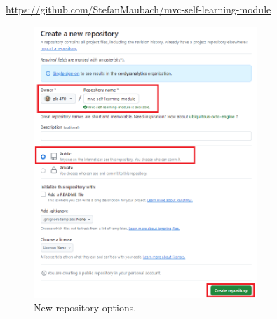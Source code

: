 \documentclass[a4paper,10pt]{article}
\begin{document}
\url{https://github.com/StefanMaubach/mvc-self-learning-module}

\begin{figure}[htbp]
    \centering
    \includegraphics[width=0.75\textwidth]{new_repository_options.png}
    \caption{New repository options.}
    \label{fig:new_repository_options}   
\end{figure}
\end{document}
